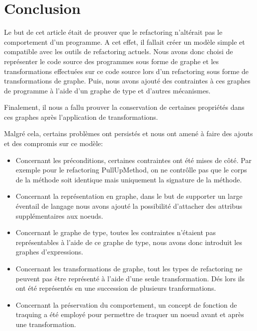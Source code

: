 \documentclass[a4paper, 12pt]{article}
\begin{document}
  \section{Conclusion}

  Le but de cet article était de prouver que le refactoring n'altérait pas le comportement d'un programme.
  A cet effet, il fallait créer un modèle simple et compatible avec les outils de refactoring actuels. Nous avons donc choisi de représenter le code source des programmes sous forme de graphe
  et les transformations effectuées sur ce code source lors d'un refactoring sous forme de transformations de graphe.
  Puis, nous avons ajouté des contraintes à ces graphes de programme à l'aide d'un graphe de type et d'autres mécanismes.

  Finalement, il nous a fallu prouver la conservation de certaines propriétés dans ces graphes après l'application de transformations.

  Malgré cela, certains problèmes ont persistés et nous ont amené à faire des ajouts et des compromis sur ce modèle:

  \begin{itemize}[label=\textbullet]
    \item Concernant les préconditions, certaines contraintes ont été mises de côté. Par exemple pour le refactoring PullUpMethod, on ne contrôlle pas que le corps de la méthode soit identique mais uniquement la signature de la méthode.

    \item Concernant la représentation en graphe, dans le but de supporter un large éventail de langage nous avons ajouté la possibilité d'attacher des attribus supplémentaires aux noeuds.

    \item Concernant le graphe de type, toutes les contraintes n'étaient pas représentables à l'aide de ce graphe de type, nous avons donc introduit les graphes d'expressions.

    \item Concernant les transformations de graphe, tout les types de refactoring ne peuvent pas être représenté à l'aide d'une seule transformation.
    Dés lors ils ont été représentés en une succession de plusieurs tranformations.

    \item Concernant la préservation du comportement, un concept de fonction de traquing a été employé pour permettre de traquer un noeud avant et après une transformation.
  \end{itemize}
\end{document}
